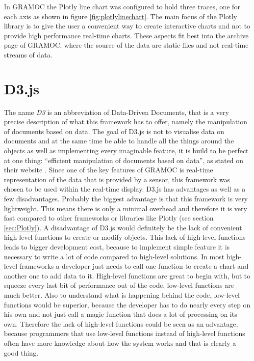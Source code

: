In GRAMOC the Plotly line chart was configured to hold three traces, one for each axis as shown in figure \vref{fig:plotlylinechart}. The main focus of the Plotly library is to give the user a convenient way to create interactive charts and not to provide high performance real-time charts. These aspects fit best into the archive page of GRAMOC, where the source of the data are static files and not real-time streams of data.

\section{D3.js}
The name \textit{D3} is an abbreviation of Data-Driven Documents, that is a very precise description of what this framework has to offer, namely the manipulation of documents based on data. The goal of D3.js is not to visualise data on documents and at the same time be able to handle all the things around the objects as well as implementing every imaginable feature, it is build to be perfect at one thing: ``efficient manipulation of documents based on data'', as stated on their website \autocite{d3}. Since one of the key features of GRAMOC is real-time representation of the data that is provided by a sensor, this framework was chosen to be used within the real-time display. D3.js has advantages as well as a few disadvantages. Probably the biggest advantage is that this framework is very lightweight. This means there is only a minimal overhead and therefore it is very fast compared to other frameworks or libraries like Plotly (see section \vref{sec:Plotly}). A disadvantage of D3.js would definitely be the lack of convenient high-level functions to create or modify objects. This lack of high-level functions leads to bigger development cost, because to implement simple feature it is necessary to write a lot of code compared to high-level solutions. In most high-level frameworks a developer just needs to call one function to create a chart and another one to add data to it. High-level functions are great to begin with, but to squeeze every last bit of performance out of the code, low-level functions are much better. Also to understand what is happening behind the code, low-level functions would be superior, because the developer has to do nearly every step on his own and not just call a magic function that does a lot of processing on its own. Therefore the lack of high-level functions could be seen as an advantage, because programmers that use low-level functions instead of high-level functions often have more knowledge about how the system works and that is clearly a good thing.

